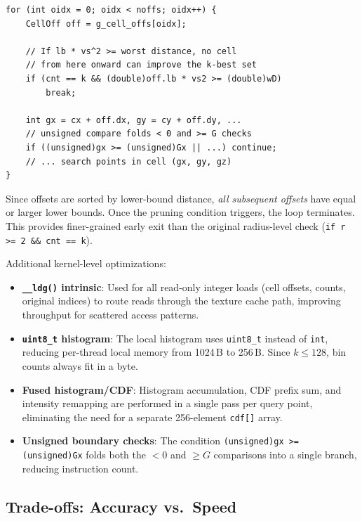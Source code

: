 \documentclass[11pt,a4paper]{article}
\begin{document}
\begin{lstlisting}[caption={Cell-level pruning via lower-bound key}]
for (int oidx = 0; oidx < noffs; oidx++) {
    CellOff off = g_cell_offs[oidx];

    // If lb * vs^2 >= worst distance, no cell
    // from here onward can improve the k-best set
    if (cnt == k && (double)off.lb * vs2 >= (double)wD)
        break;

    int gx = cx + off.dx, gy = cy + off.dy, ...
    // unsigned compare folds < 0 and >= G checks
    if ((unsigned)gx >= (unsigned)Gx || ...) continue;
    // ... search points in cell (gx, gy, gz)
}
\end{lstlisting}

Since offsets are sorted by lower-bound distance, \emph{all subsequent offsets} have equal or larger lower bounds. Once the pruning condition triggers, the loop terminates. This provides finer-grained early exit than the original radius-level check (\texttt{if r >= 2 \&\& cnt == k}).

Additional kernel-level optimizations:
\begin{itemize}
    \item \textbf{\texttt{\_\_ldg()} intrinsic}: Used for all read-only integer loads (cell offsets, counts, original indices) to route reads through the texture cache path, improving throughput for scattered access patterns.
    \item \textbf{\texttt{uint8\_t} histogram}: The local histogram uses \texttt{uint8\_t} instead of \texttt{int}, reducing per-thread local memory from 1024\,B to 256\,B. Since $k \leq 128$, bin counts always fit in a byte.
    \item \textbf{Fused histogram/CDF}: Histogram accumulation, CDF prefix sum, and intensity remapping are performed in a single pass per query point, eliminating the need for a separate 256-element \texttt{cdf[]} array.
    \item \textbf{Unsigned boundary checks}: The condition \texttt{(unsigned)gx >= (unsigned)Gx} folds both the $< 0$ and $\geq G$ comparisons into a single branch, reducing instruction count.
\end{itemize}

\subsection{Trade-offs: Accuracy vs.\ Speed}
\end{document}
